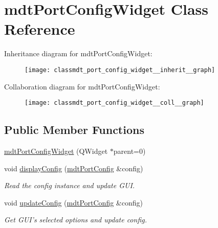 \hypertarget{classmdt_port_config_widget}{
\section{mdtPortConfigWidget Class Reference}
\label{classmdt_port_config_widget}
}


Inheritance diagram for mdtPortConfigWidget:\nopagebreak
\begin{figure}[H]
\begin{center}
\leavevmode
\texttt{[image: classmdt\_port\_config\_widget\_\_inherit\_\_graph]}
\end{center}
\end{figure}


Collaboration diagram for mdtPortConfigWidget:\nopagebreak
\begin{figure}[H]
\begin{center}
\leavevmode
\texttt{[image: classmdt\_port\_config\_widget\_\_coll\_\_graph]}
\end{center}
\end{figure}
\subsection*{Public Member Functions}
\begin{DoxyCompactItemize}
\item 
\hyperlink{classmdt_port_config_widget_a5887fadc0001e3438c67de884f8e8f67}{mdtPortConfigWidget} (QWidget $\ast$parent=0)
\item 
void \hyperlink{classmdt_port_config_widget_a44c1690242f5f8680fb4f32a5771534f}{displayConfig} (\hyperlink{classmdt_port_config}{mdtPortConfig} \&config)
\begin{DoxyCompactList}\small\item\em Read the config instance and update GUI. \end{DoxyCompactList}\item 
void \hyperlink{classmdt_port_config_widget_a23fba4fe5aa0c07b95a9b85218456456}{updateConfig} (\hyperlink{classmdt_port_config}{mdtPortConfig} \&config)
\begin{DoxyCompactList}\small\item\em Get GUI's selected options and update config. \end{DoxyCompactList}\end{DoxyCompactItemize}


